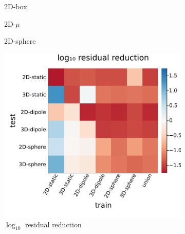 \documentclass[review]{elsarticle}
\begin{document}
\begin{figure}
    \centering
    \begin{subfigure}[b]{0.3\textwidth}
        \centering
        \caption{2D-box}
        \label{fig:2D-box}
    \end{subfigure}
    \begin{subfigure}[b]{0.3\textwidth}
        \centering
        \caption{2D-$\mu$}
        \label{fig:2D-mu}
    \end{subfigure}
    \begin{subfigure}[b]{0.3\textwidth}
        \centering
        \caption{2D-sphere}
        \label{fig:2D-sphere}
    \end{subfigure}
    \begin{subfigure}[b]{0.47\textwidth}
        \centering
        \includegraphics[width=\textwidth]{figures/crossloss.png}
        \caption{$\log_{10}$ residual reduction}
        \label{fig:cross plot}
    \end{subfigure}
    \hfill
    \begin{subfigure}[b]{0.47\textwidth}
        \centering

\end{subfigure}
\end{figure}
\end{document}
